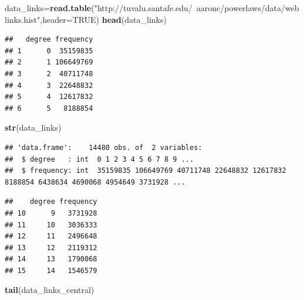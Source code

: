 \documentclass[
]{article}
\newenvironment{Shaded}{\begin{snugshade}}{\end{snugshade}}
\newcommand{\CommentTok}[1]{\textcolor[rgb]{0.56,0.35,0.01}{\textit{#1}}}
\newcommand{\DataTypeTok}[1]{\textcolor[rgb]{0.13,0.29,0.53}{#1}}
\newcommand{\DecValTok}[1]{\textcolor[rgb]{0.00,0.00,0.81}{#1}}
\newcommand{\KeywordTok}[1]{\textcolor[rgb]{0.13,0.29,0.53}{\textbf{#1}}}
\newcommand{\NormalTok}[1]{#1}
\newcommand{\OperatorTok}[1]{\textcolor[rgb]{0.81,0.36,0.00}{\textbf{#1}}}
\newcommand{\OtherTok}[1]{\textcolor[rgb]{0.56,0.35,0.01}{#1}}
\newcommand{\StringTok}[1]{\textcolor[rgb]{0.31,0.60,0.02}{#1}}
\begin{document}
\begin{Shaded}
\begin{Highlighting}[]
\NormalTok{data_links=}\KeywordTok{read.table}\NormalTok{(}\StringTok{"http://tuvalu.santafe.edu/~aaronc/powerlaws/data/weblinks.hist"}\NormalTok{,}\DataTypeTok{header=}\OtherTok{TRUE}\NormalTok{)}
\KeywordTok{head}\NormalTok{(data_links)}
\end{Highlighting}
\end{Shaded}

\begin{verbatim}
##   degree frequency
## 1      0  35159835
## 2      1 106649769
## 3      2  40711748
## 4      3  22648832
## 5      4  12617832
## 6      5   8188854
\end{verbatim}

\begin{Shaded}
\begin{Highlighting}[]
\KeywordTok{str}\NormalTok{(data_links)}
\end{Highlighting}
\end{Shaded}

\begin{verbatim}
## 'data.frame':    14480 obs. of  2 variables:
##  $ degree   : int  0 1 2 3 4 5 6 7 8 9 ...
##  $ frequency: int  35159835 106649769 40711748 22648832 12617832 8188854 6438634 4690068 4954649 3731928 ...
\end{verbatim}

\begin{Shaded}
\end{Shaded}

\begin{verbatim}
##    degree frequency
## 10      9   3731928
## 11     10   3036333
## 12     11   2496648
## 13     12   2119312
## 14     13   1790068
## 15     14   1546579
\end{verbatim}

\begin{Shaded}
\begin{Highlighting}[]
\KeywordTok{tail}\NormalTok{(data_links_central)}
\end{Highlighting}
\end{Shaded}
\end{document}
